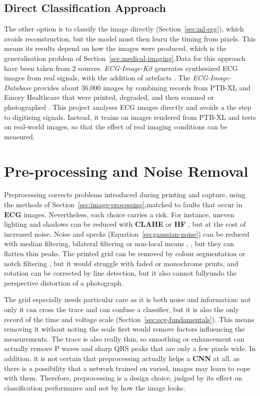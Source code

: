 \subsection{Direct Classification Approach}
\label{sec:direct-classification}
The other option is to classify the image directly (Section~\ref{sec:ml-ecg}), which avoids reconstruction, but the model must then learn the timing from pixels. This means its results depend on how the images were produced, which is the generalisation problem of Section~\ref{sec:medical-imaging}.Data for this approach have been taken from 2 sources. \textit{ECG-Image-Kit} generates
synthesized ECG images from real signals, with the addition of artefacts
\cite{shivashankara_ecg-image-kit_2024}. The \textit{ECG-Image-Database} provides about 36,000
images by combining records from PTB-XL and Emory Healthcare that were printed, degraded, %
and then scanned or photographed \cite{reyna_ecg-image-database_2024}. This project
analyses ECG images directly and avoids a the step to digitising signals. Instead, it trains on images
rendered from PTB-XL and tests on real-world images, so that the effect of real imaging
conditions can be measured.

\section{Pre-processing and Noise Removal}
\label{sec:preprocessing}

Preprocessing corrects problems introduced during printing and capture, using the
methods of Section~\ref{sec:image-processing},matched to faults that occur in \textbf{ECG}
images. Nevertheless, each choice carries a risk. For instance, uneven lighting and shadows can be reduced with \textbf{CLAHE}
\cite{pizer_adaptive_1987,zuiderveld_contrast_1994} or \textbf{HF}
\cite{stockham_image_1972}, but at the cost of increased noise. Noise and specks
(Equation~\ref{eq:gaussian-noise}) can be reduced with median filtering, bilateral
filtering \cite{tomasi_bilateral_1998} or non-local means \cite{buades_non-local_2005},
, but they can flatten thin peaks. The printed grid can be removed by colour
segmentation or notch filtering \cite{gonzalez_digital_2018}, but it would struggle with faded
or monochrome prints, and rotation can be corrected by line detection, but it also cannot fullyundo the perspective distortion of a photograph.

The grid especially needs particular care as it is both noise and information: not only it can cross the
trace and can confuse a classifier, but it is also the only record of the time and voltage scale (Section~\ref{sec:ecg-fundamentals}). This means removing it without noting the
scale first would remove factors influencing the measurements. The trace is also really thin, so
smoothing or enhancement can actually remove P waves and sharp QRS peaks that are only a few
pixels wide. In addition, it is not certain that preprocessing actually helps a \textbf{CNN} at all, as there is a possibility that a
network trained on varied, images may learn to cope with them. Therefore, preprocessing is a design choice, judged by its effect on classification performance and not by how the image looks.

